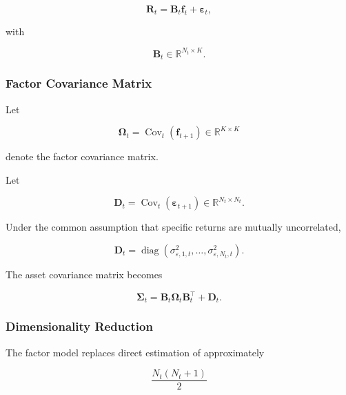 \documentclass[11pt,a4paper]{article}
\begin{document}
\begin{equation}
\boxed{
\mathbf{R}_t
=
\mathbf{B}_t
\mathbf{f}_t
+
\boldsymbol{\varepsilon}_t,
}
\end{equation}

with

\begin{equation}
\mathbf{B}_t
\in
\mathbb{R}^{N_t\times K}.
\end{equation}


\subsubsection{Factor Covariance Matrix}

Let

\begin{equation}
\boldsymbol{\Omega}_t
=
\operatorname{Cov}_t
\left(
\mathbf{f}_{t+1}
\right)
\in
\mathbb{R}^{K\times K}
\end{equation}

denote the factor covariance matrix.

Let

\begin{equation}
\mathbf{D}_t
=
\operatorname{Cov}_t
\left(
\boldsymbol{\varepsilon}_{t+1}
\right)
\in
\mathbb{R}^{N_t\times N_t}.
\end{equation}

Under the common assumption that specific returns are mutually uncorrelated,

\begin{equation}
\boxed{
\mathbf{D}_t
=
\operatorname{diag}
\left(
\sigma_{\varepsilon,1,t}^{2},
\ldots,
\sigma_{\varepsilon,N_t,t}^{2}
\right).
}
\end{equation}

The asset covariance matrix becomes

\begin{equation}
\boxed{
\boldsymbol{\Sigma}_t
=
\mathbf{B}_t
\boldsymbol{\Omega}_t
\mathbf{B}_t^\top
+
\mathbf{D}_t.
}
\end{equation}


\subsubsection{Dimensionality Reduction}

The factor model replaces direct estimation of approximately

\begin{equation}
\frac{N_t(N_t+1)}{2}
\end{equation}
\end{document}
